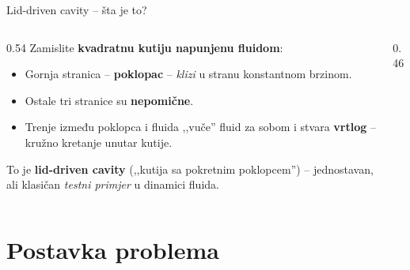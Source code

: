 \documentclass[10pt,aspectratio=169]{beamer}
\begin{document}
\begin{frame}{Lid-driven cavity -- šta je to?}
  \begin{columns}[T]
    \begin{column}{0.54\textwidth}
      \small
      Zamislite \textbf{kvadratnu kutiju napunjenu fluidom}:
      \medskip
      \begin{itemize}
        \item Gornja stranica -- \textbf{poklopac} -- \emph{klizi} u stranu
              konstantnom brzinom.
        \item Ostale tri stranice su \textbf{nepomične}.
        \item Trenje između poklopca i fluida ,,vuče'' fluid za sobom
              i stvara \textbf{vrtlog} -- kružno kretanje unutar kutije.
      \end{itemize}
      \medskip
      To je \textbf{lid-driven cavity} (,,kutija sa pokretnim poklopcem'') --
      jednostavan, ali klasičan \emph{testni primjer} u dinamici fluida.
    \end{column}
    \begin{column}{0.46\textwidth}
      \centering
    \end{column}
  \end{columns}
\end{frame}

\section{Postavka problema}  
\end{document}
